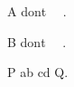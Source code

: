 \documentclass{article}
\begin{document}
A dont    .

B dont    .

P \csname ab\endcsname{} \csname cd\endcsname{} Q.
\end{document}
